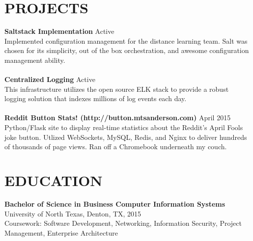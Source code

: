 \documentclass[line, margin,]{res}
\begin{document}
\begin{resume}
\section{PROJECTS}
\textbf{Saltstack Implementation} \hfill Active \\ [5pt]
Implemented configuration management for the distance learning team. Salt was chosen for its simplicity, out of the box orchestration, and awesome configuration management ability. \\ \\ 
\textbf{Centralized Logging} \hfill Active \\ [5pt]
This infrastructure utilizes the open source ELK stack to provide a robust logging solution that indexes millions of log events each day. \\ \\
\textbf{Reddit Button Stats! (http://button.mtsanderson.com)} \hfill April 2015 \\ [5pt]
Python/Flask site to display real-time statistics about the Reddit's April Fools joke button. Utlized WebSockets, MySQL, Redis, and Nginx to deliver hundreds of thousands of page views. Ran off a Chromebook underneath my couch.

\section{EDUCATION} 
\textbf{Bachelor of Science in Business Computer Information Systems} \\
University of North Texas, Denton, TX, 2015 \\
Coursework: Software Development, Networking, Information Security, Project Management, Enterprise Architecture
 
\end{resume}
\end{document}
